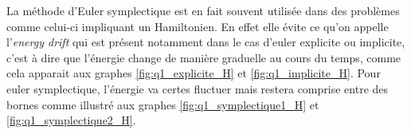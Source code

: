  La méthode d'Euler symplectique est en fait souvent utilisée dans des problèmes comme celui-ci impliquant un Hamiltonien. En effet elle évite ce qu'on appelle l'\textit{energy drift} qui est présent notamment dans le cas d'euler explicite ou implicite, c'est à dire que l'énergie change de manière graduelle au cours du temps, comme cela apparait aux graphes \ref{fig:q1_explicite_H} et \ref{fig:q1_implicite_H}. Pour euler symplectique, l'énergie va certes fluctuer mais restera comprise entre des bornes comme illustré aux graphes \ref{fig:q1_symplectique1_H} et \ref{fig:q1_symplectique2_H}. 
